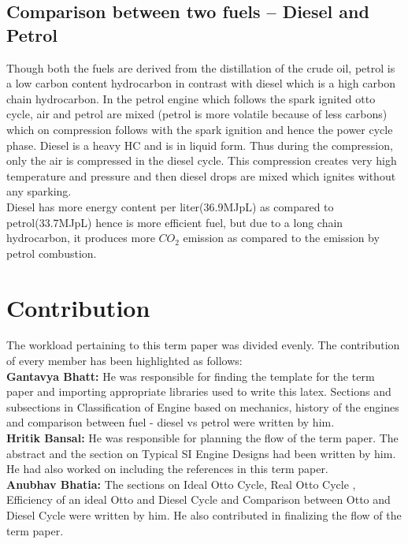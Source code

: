 \documentclass[11pt]{article}
\begin{document}
\subsection{Comparison between two fuels -- Diesel and Petrol}
Though both the fuels are derived from the distillation of the crude oil, petrol is a low carbon content hydrocarbon in contrast with diesel which is a high carbon chain hydrocarbon. In the petrol engine which follows the spark ignited otto cycle, air and petrol are mixed (petrol is more volatile because of less carbons) which on compression follows with the spark ignition and hence the power cycle phase. Diesel is a heavy HC and is in liquid form. Thus during the compression, only the air is compressed in the diesel cycle. This compression creates very high temperature and pressure and then diesel drops are mixed which ignites without any sparking.\\
Diesel has more energy content per liter(36.9MJpL) as compared to petrol(33.7MJpL) hence is more efficient fuel, but due to a long chain hydrocarbon, it produces more \(CO_2\) emission as compared to the emission by petrol combustion.


\section{Contribution}

The workload pertaining to this term paper was divided evenly. The contribution of every member has been highlighted as follows:\\
\textbf{Gantavya Bhatt:} He was responsible for finding the template for the term paper and importing appropriate libraries used to write this latex. Sections and subsections in Classification of Engine based on mechanics, history of the engines and comparison between fuel -  diesel vs petrol were written by him. \\ 
\textbf{Hritik Bansal:} He was responsible for planning the flow of the term paper. The abstract and the section on Typical SI Engine Designs had been written by him. He had also worked on including the references in this term paper. \\
\textbf{Anubhav Bhatia:} The sections on Ideal Otto Cycle, Real Otto Cycle , Efficiency of an ideal Otto and Diesel Cycle  and Comparison between Otto and Diesel Cycle were written by him. He also contributed in finalizing the flow of the term paper. \\
\end{document}
